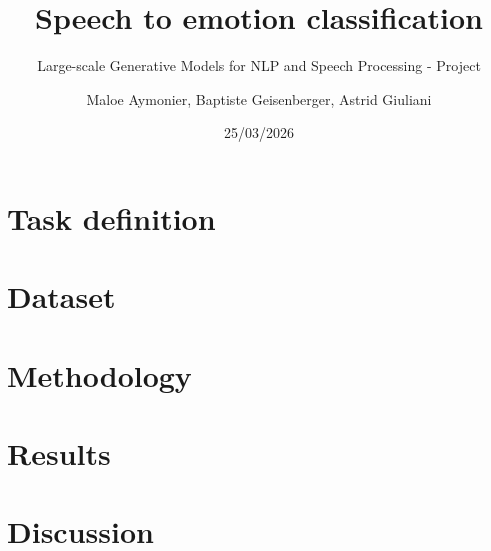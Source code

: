 \documentclass{beamer}					%
\title{Speech to emotion classification}	%
\subtitle{Large-scale Generative Models for NLP and Speech Processing - Project}		%
\author{Maloe Aymonier, Baptiste Geisenberger, Astrid Giuliani}								%
\date{25/03/2026}									%
\begin{document}
\begin{frame}
  \titlepage
\end{frame}


%



\section{Task definition} 

\section{Dataset}

\section{Methodology}

\section{Results}


\section{Discussion}
\end{document}
